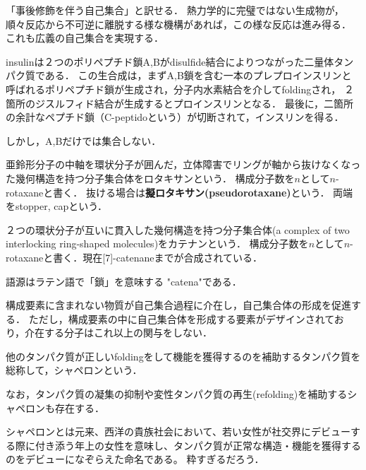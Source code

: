 \documentclass[uplatex, dvipdfmx]{jsreport}
\begin{document}
\begin{definition}
    「事後修飾を伴う自己集合」と訳せる．
    熱力学的に完璧ではない生成物が，順々反応から不可逆に離脱する様な機構があれば，この様な反応は進み得る．
    これも広義の自己集合を実現する．
\end{definition}
\begin{example}[insulinの生合成]
    insulinは２つのポリペプチド鎖A,Bがdisulfide結合によりつながった二量体タンパク質である．
    この生合成は，まずA,B鎖を含む一本のプレプロインスリンと呼ばれるポリペプチド鎖が生成され，分子内水素結合を介してfoldingされ，
    ２箇所のジスルフィド結合が生成するとプロインスリンとなる．
    最後に，二箇所の余計なペプチド鎖（C-peptidoという）が切断されて，インスリンを得る．

    しかし，A,Bだけでは集合しない．
\end{example}
\begin{definition}[rotaxane]
    亜鈴形分子の中軸を環状分子が囲んだ，立体障害でリングが軸から抜けなくなった幾何構造を持つ分子集合体をロタキサンという．
    構成分子数を$n$として$n$-rotaxaneと書く．
    抜ける場合は\textbf{擬ロタキサン(pseudorotaxane)}という．
    両端をstopper, capという．
\end{definition}
\begin{definition}[catenane]
    ２つの環状分子が互いに貫入した幾何構造を持つ分子集合体(a complex of two interlocking ring-shaped molecules)をカテナンという．
    構成分子数を$n$として$n$-rotaxaneと書く．現在[7]-catenaneまでが合成されている．
\end{definition}
\begin{remark}
    語源はラテン語で「鎖」を意味する "catena"である．
\end{remark}

\begin{definition}
    構成要素に含まれない物質が自己集合過程に介在し，自己集合体の形成を促進する．
    ただし，構成要素の中に自己集合体を形成する要素がデザインされており，介在する分子はこれ以上の関与をしない．
\end{definition}
\begin{definition}
    他のタンパク質が正しいfoldingをして機能を獲得するのを補助するタンパク質を総称して，シャペロンという．

    なお，タンパク質の凝集の抑制や変性タンパク質の再生(refolding)を補助するシャペロンも存在する．
\end{definition}
\begin{remark}
    シャペロンとは元来、西洋の貴族社会において、若い女性が社交界にデビューする際に付き添う年上の女性を意味し、タンパク質が正常な構造・機能を獲得するのをデビューになぞらえた命名である。
    粋すぎるだろう．
\end{remark}
\end{document}
